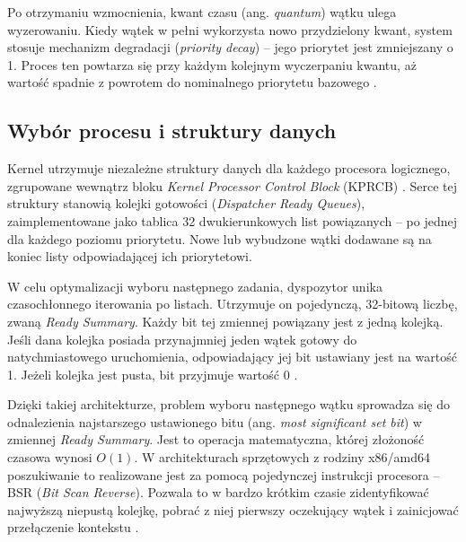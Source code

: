 Po otrzymaniu wzmocnienia, kwant czasu (ang. \textit{quantum}) wątku ulega wyzerowaniu. Kiedy wątek w pełni wykorzysta nowo przydzielony kwant, system stosuje mechanizm degradacji (\textit{priority decay}) – jego priorytet jest zmniejszany o 1. Proces ten powtarza się przy każdym kolejnym wyczerpaniu kwantu, aż wartość spadnie z powrotem do nominalnego priorytetu bazowego \cite{bsodTutorialsQuantumBoost}.

\subsection{Wybór procesu i struktury danych}
Kernel utrzymuje niezależne struktury danych dla każdego procesora logicznego, zgrupowane wewnątrz bloku \textit{Kernel Processor Control Block} (KPRCB) \cite{reactosThrdschdC}. Serce tej struktury stanowią kolejki gotowości (\textit{Dispatcher Ready Queues}), zaimplementowane jako tablica 32 dwukierunkowych list powiązanych – po jednej dla każdego poziomu priorytetu. Nowe lub wybudzone wątki dodawane są na koniec listy odpowiadającej ich priorytetowi.

W celu optymalizacji wyboru następnego zadania, dyspozytor unika czasochłonnego iterowania po listach. Utrzymuje on pojedynczą, 32-bitową liczbę, zwaną \textit{Ready Summary}. Każdy bit tej zmiennej powiązany jest z jedną kolejką. Jeśli dana kolejka posiada przynajmniej jeden wątek gotowy do natychmiastowego uruchomienia, odpowiadający jej bit ustawiany jest na wartość 1. Jeżeli kolejka jest pusta, bit przyjmuje wartość 0 \cite{solomon2000threadScheduling}.

Dzięki takiej architekturze, problem wyboru następnego wątku sprowadza się do odnalezienia najstarszego ustawionego bitu (ang. \textit{most significant set bit}) w zmiennej \textit{Ready Summary}. Jest to operacja matematyczna, której złożoność czasowa wynosi $O(1)$. W architekturach sprzętowych z rodziny x86/amd64 poszukiwanie to realizowane jest za pomocą pojedynczej instrukcji procesora – BSR (\textit{Bit Scan Reverse}). Pozwala to w bardzo krótkim czasie zidentyfikować najwyższą niepustą kolejkę, pobrać z niej pierwszy oczekujący wątek i zainicjować przełączenie kontekstu \cite{reactosKeX}.
